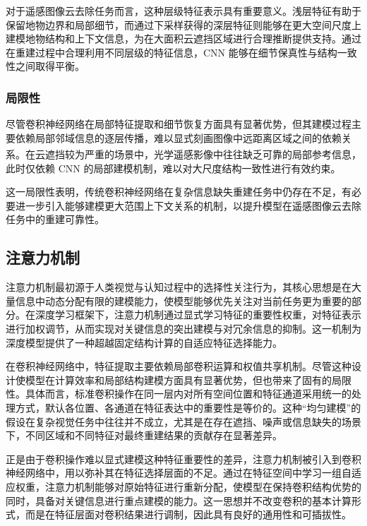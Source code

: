 对于遥感图像云去除任务而言，这种层级特征表示具有重要意义。浅层特征有助于保留地物边界和局部细节，而通过下采样获得的深层特征则能够在更大空间尺度上建模地物结构和上下文信息，为在大面积云遮挡区域进行合理推断提供支持。通过在重建过程中合理利用不同层级的特征信息，CNN 能够在细节保真性与结构一致性之间取得平衡。

\subsubsection{局限性}

尽管卷积神经网络在局部特征提取和细节恢复方面具有显著优势，但其建模过程主要依赖局部邻域信息的逐层传播，难以显式刻画图像中远距离区域之间的依赖关系\textsuperscript{\cite{wang2018non}}。在云遮挡较为严重的场景中，光学遥感影像中往往缺乏可靠的局部参考信息，此时仅依赖 CNN 的局部建模机制，难以对大尺度结构一致性进行有效约束。

这一局限性表明，传统卷积神经网络在复杂信息缺失重建任务中仍存在不足，有必要进一步引入能够建模更大范围上下文关系的机制，以提升模型在遥感图像云去除任务中的重建可靠性。

\subsection{注意力机制}

注意力机制最初源于人类视觉与认知过程中的选择性关注行为，其核心思想是在大量信息中动态分配有限的建模能力，使模型能够优先关注对当前任务更为重要的部分。在深度学习框架下，注意力机制通过显式学习特征的重要性权重，对特征表示进行加权调节，从而实现对关键信息的突出建模与对冗余信息的抑制。这一机制为深度模型提供了一种超越固定结构计算的自适应特征选择能力。

在卷积神经网络中，特征提取主要依赖局部卷积运算和权值共享机制。尽管这种设计使模型在计算效率和局部结构建模方面具有显著优势，但也带来了固有的局限性。具体而言，标准卷积操作在同一层内对所有空间位置和特征通道采用统一的处理方式，默认各位置、各通道在特征表达中的重要性是等价的。这种“均匀建模”的假设在复杂视觉任务中往往并不成立，尤其是在存在遮挡、噪声或信息缺失的场景下，不同区域和不同特征对最终重建结果的贡献存在显著差异。

正是由于卷积操作难以显式建模这种特征重要性的差异，注意力机制被引入到卷积神经网络中，用以弥补其在特征选择层面的不足。通过在特征空间中学习一组自适应权重，注意力机制能够对原始特征进行重新分配，使模型在保持卷积结构优势的同时，具备对关键信息进行重点建模的能力。这一思想并不改变卷积的基本计算形式，而是在特征层面对卷积结果进行调制，因此具有良好的通用性和可插拔性。


